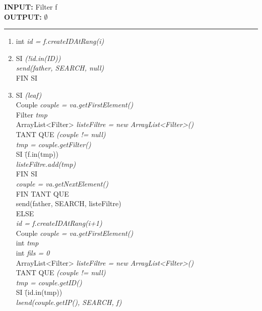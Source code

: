 \documentclass[a4paper,11pt]{report}
\begin{document}
\begin{flushleft}
	\begin{framed}
		\textbf{INPUT:} Filter f\\
		\textbf{OUTPUT:} $\emptyset$
		\noindent\rule{\linewidth}{0.5pt}

		\begin{enumerate}
			\item int \textit{id = f.createIDAtRang(i)}
			\item
			\begin{tabbing}
				SI \= \textit{(!id.in(ID))}\\
					\> \textit{send(father, SEARCH, null)}\\
				FIN SI
			\end{tabbing}
			\item 
			\begin{tabbing}
				SI \= \textit{(leaf)}\\
					\> Couple \textit{couple = va.getFirstElement()}\\
					\> Filter \textit{tmp}\\
					\> ArrayList<Filter> \textit{listeFiltre = new ArrayList<Filter>()}\\
					\> TANT QUE \= \textit{(couple != null)}\\
					\> \> \textit{tmp = couple.getFilter()}\\
					\> \> SI \= (f.in(tmp)) \\
					\> \> \> \textit{listeFiltre.add(tmp)}\\
					\> \> FIN SI\\
					\> \> \textit{couple = va.getNextElement()}\\
					\> FIN TANT QUE\\ 
					\> send(father, SEARCH, listeFiltre)\\
				ELSE\\
					\> \textit{id = f.createIDAtRang(i+1)}\\
					\> Couple \textit{couple = va.getFirstElement()}\\
					\> int \textit{tmp}\\
					\> int \textit{fils = 0}\\
					\> ArrayList<Filter> \textit{listeFiltre = new ArrayList<Filter>()}\\
					\> TANT QUE \= \textit{(couple != null)}\\
					\> \> \textit{tmp = couple.getID()}\\
					\> \> SI \= (id.in(tmp)) \\
					\> \> \> \textit{lsend(couple.getIP(), SEARCH, f)}\\

\end{tabbing}
\end{enumerate}
\end{framed}
\end{flushleft}
\end{document}

